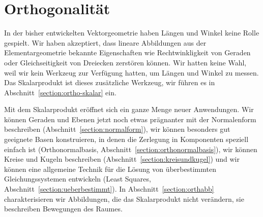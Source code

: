 %
%
%
\chapter{Orthogonalität\label{chapter:orthogonalitaet}}
\rhead{}
In der bisher entwickelten Vektorgeometrie haben Längen und Winkel keine 
Rolle gespielt.
Wir haben akzeptiert, dass lineare Abbildungen aus der Elementargeometrie
bekannte Eigenschaften wie Rechtwinkligkeit von Geraden oder Gleichseitigkeit
von Dreiecken zerstören können.
Wir hatten keine Wahl, weil wir kein Werkzeug zur Verfügung hatten, 
um Längen und Winkel zu messen.
Das Skalarprodukt ist dieses zusätzliche Werkzeug, wir führen es in
Abschnitt~\ref{section:ortho-skalar} ein.

Mit dem Skalarprodukt eröffnet sich ein ganze Menge neuer Anwendungen.
Wir können Geraden und Ebenen jetzt noch etwas prägnanter mit
der Normalenform beschreiben (Abschnitt~\ref{section:normalform}),
wir können besonders gut geeignete Basen konstruieren, in denen die
Zerlegung in Komponenten speziell einfach ist
(Orthonormalbasis, Abschnitt~\ref{section:orthonormalbasis}),
wir können Kreise und Kugeln
beschreiben (Abschnitt~\ref{section:kreisundkugel}) und wir können eine
allgemeine Technik für die Lösung von überbestimmten Gleichungssystemen
entwickeln (Least Squares, Abschnitt~\ref{section:ueberbestimmt}).
In Abschnitt~\ref{section:orthabb} charakterisieren wir Abbildungen,
die das Skalarprodukt nicht verändern, sie beschreiben Bewegungen
des Raumes.

%







